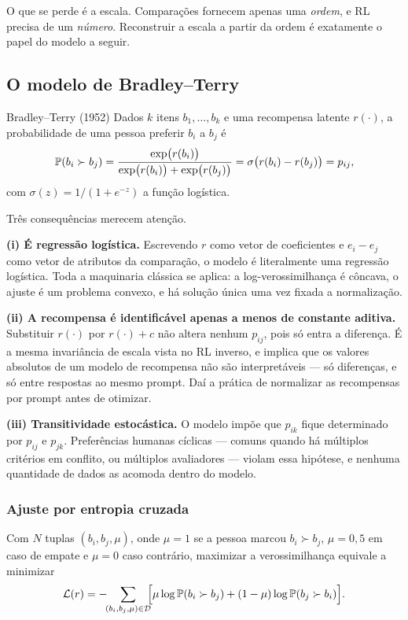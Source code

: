 \documentclass[11pt, a4paper]{article}
\newcommand{\Dset}{\mathcal{D}}
\newcommand{\sig}{\sigma}
\begin{document}
O que se perde é a escala. Comparações fornecem apenas uma \emph{ordem}, e RL
precisa de um \emph{número}. Reconstruir a escala a partir da ordem é exatamente
o papel do modelo a seguir.

\subsection{O modelo de Bradley--Terry}

\begin{defbox}{Bradley--Terry (1952)}
Dados $k$ itens $b_1,\dots,b_k$ e uma recompensa latente $r(\cdot)$, a
probabilidade de uma pessoa preferir $b_i$ a $b_j$ é
\[
  \Prob(b_i \succ b_j)
    = \frac{\exp\bigl(r(b_i)\bigr)}{\exp\bigl(r(b_i)\bigr)+\exp\bigl(r(b_j)\bigr)}
    = \sig\bigl(r(b_i)-r(b_j)\bigr) = p_{ij},
\]
com $\sig(z) = 1/(1+e^{-z})$ a função logística.
\end{defbox}

Três consequências merecem atenção.

\textbf{(i) É regressão logística.} Escrevendo $r$ como vetor de coeficientes e
$e_i - e_j$ como vetor de atributos da comparação, o modelo é literalmente uma
regressão logística. Toda a maquinaria clássica se aplica: a
log-verossimilhança é côncava, o ajuste é um problema convexo, e há solução
única uma vez fixada a normalização.

\textbf{(ii) A recompensa é identificável apenas a menos de constante aditiva.}
Substituir $r(\cdot)$ por $r(\cdot)+c$ não altera nenhum $p_{ij}$, pois só entra
a diferença. É a mesma invariância de escala vista no RL inverso, e implica que
os valores absolutos de um modelo de recompensa não são interpretáveis --- só
diferenças, e só entre respostas ao mesmo prompt. Daí a prática de normalizar as
recompensas por prompt antes de otimizar.

\textbf{(iii) Transitividade estocástica.} O modelo impõe que $p_{ik}$ fique
determinado por $p_{ij}$ e $p_{jk}$. Preferências humanas cíclicas --- comuns
quando há múltiplos critérios em conflito, ou múltiplos avaliadores --- violam
essa hipótese, e nenhuma quantidade de dados as acomoda dentro do modelo.

\subsubsection*{Ajuste por entropia cruzada}

Com $N$ tuplas $(b_i,b_j,\mu)$, onde $\mu=1$ se a pessoa marcou $b_i \succ b_j$,
$\mu=0{,}5$ em caso de empate e $\mu=0$ caso contrário, maximizar a
verossimilhança equivale a minimizar
\[
  \mathcal{L}(r) = -\!\!\sum_{(b_i,b_j,\mu)\in\Dset}\!\!
    \Bigl[\mu\log\Prob(b_i\succ b_j) + (1-\mu)\log\Prob(b_j\succ b_i)\Bigr].
\]
\end{document}
